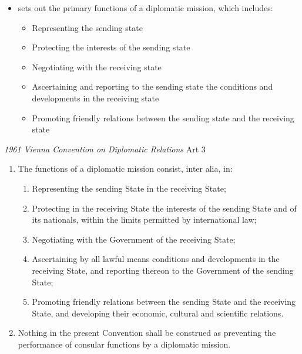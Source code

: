 \begin{itemize}
    \item {} sets out the primary functions of a diplomatic mission, which includes:
    \begin{itemize}
        \item Representing the sending state
        \item Protecting the interests of the sending state
        \item Negotiating with the receiving state
        \item Ascertaining and reporting to the sending state the conditions and developments in the receiving state
        \item Promoting friendly relations between the sending state and the receiving state
    \end{itemize}
\end{itemize}

\begin{conventiondetails}{\textit{1961 Vienna Convention on Diplomatic Relations} Art 3}
    \flushleft
    \begin{enumerate}
        \item The functions of a diplomatic mission consist, inter alia, in:
        \begin{enumerate}
            \item Representing the sending State in the receiving State;
            \item Protecting in the receiving State the interests of the sending State and of its nationals, within the limits permitted by international law;
            \item Negotiating with the Government of the receiving State;
            \item Ascertaining by all lawful means conditions and developments in the receiving State, and reporting thereon to the Government of the sending State;
            \item Promoting friendly relations between the sending State and the receiving State, and developing their economic, cultural and scientific relations.
        \end{enumerate}
        \item  Nothing in the present Convention shall be construed as preventing the performance of consular functions by a diplomatic mission.
    \end{enumerate}
\end{conventiondetails}

